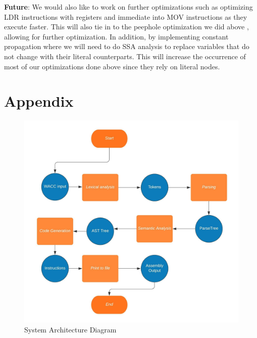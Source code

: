 \documentclass[11pt,a4paper]{article}
\begin{document}
\noindent \textbf{Future}: We would also like to work on further optimizations such as optimizing LDR instructions with registers and immediate into MOV instructions as they execute faster. This will also tie in to the peephole optimization we did above , allowing for further optimization. In addition, by implementing constant propagation where we will need to do SSA analysis to replace variables that do not change with their literal counterparts. This will increase the occurrence of most of our optimizations done above since they rely on literal nodes.
\newpage
\section{Appendix}

\begin{figure}[!htb]
    \label{sec:figure1}
  \includegraphics[width=\textwidth]{system.jpeg}
  \caption{System Architecture Diagram}
\end{figure}
\end{document}
